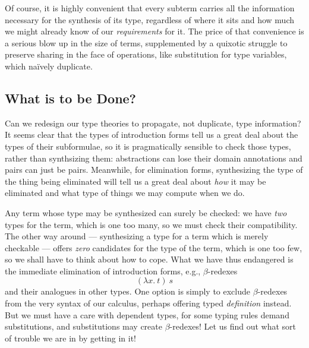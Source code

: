 \documentclass[format=acmsmall, screen, review, anonymous, timestamp]{acmart}
\begin{document}
Of course, it is highly convenient that every subterm carries all the
information necessary for the synthesis of its type, regardless of
where it sits and how much we might already know of our
\emph{requirements} for it. The price of that convenience is a serious
blow up in the size of terms, supplemented by a quixotic struggle to preserve
sharing in the face of operations, like substitution for type variables,
which na\"i{}vely duplicate.


\subsection{What is to be Done?}

Can we redesign our type theories to propagate, not duplicate, type
information? It seems clear that the types of introduction forms tell
us a great deal about the types of their subformulae, so it is
pragmatically sensible to check those types, rather than synthsizing
them: abstractions can lose their domain annotations and pairs can
just be pairs. Meanwhile, for elimination forms, synthesizing the type
of the thing being eliminated will tell us a great deal about
\emph{how} it may be eliminated and what type of things we may compute
when we do.

Any term whose type may be synthesized can surely be checked: we have
\emph{two} types for the term, which is one too many, so we must check
their compatibility. The other way around --- synthesizing a type for
a term which is merely checkable --- offers \emph{zero} candidates for
the type of the term, which is one too few, so we shall have to think
about how to cope. What we have thus endangered is the immediate
elimination of introduction forms, e.g., $\beta$-redexes
\[
  (\lambda x.\:t)\:s
\]
and their analogues in other types. One option is simply to exclude
$\beta$-redexes from the very syntax of our calculus, perhaps offering
typed \emph{definition} instead. But we must have a care with
dependent types, for some typing rules demand substitutions, and
substitutions may create $\beta$-redexes! Let us find out what sort
of trouble we are in by getting in it!





\end{document}
